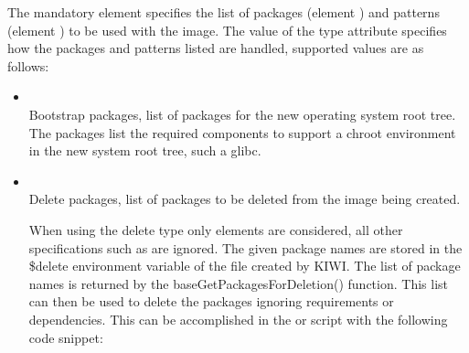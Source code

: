 The mandatory  element specifies the list of packages 
(element ) and patterns (element ) 
to be used with the image.
The value of the type attribute specifies how the packages and patterns 
listed are handled, supported values are as follows:

\begin{itemize}
\item {}\\
      Bootstrap packages, list of packages for the new operating system
      root tree. The packages list the required components to support a 
      chroot environment in the new system root tree, such a glibc.
\item {}\\
      Delete packages, list of packages to be deleted from the image being
      created.

      When using the delete type only  elements are considered, all
      other specifications such as  are ignored. The given
      package names are stored in the \$delete environment variable of the 
       file created by KIWI. The list of package names is returned 
      by the baseGetPackagesForDeletion() function. This list can then be
      used to delete the packages ignoring requirements or dependencies. 
      This can be accomplished in the  or  script with
      the following code snippet:


\end{itemize}
